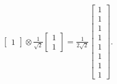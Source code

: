 \documentclass[en]{sol-man}
\begin{document}
\begin{sol}
\begin{align}
\begin{bmatrix}
            1
        \end{bmatrix}\otimes\frac{1}{\sqrt{2}}\begin{bmatrix}
            1\\
            1
        \end{bmatrix}=\frac{1}{2\sqrt{2}}\begin{bmatrix}
            1\\
            1\\
            1\\
            1\\
            1\\
            1\\
            1\\
            1
        \end{bmatrix}.
    \end{align}
\end{sol}
\end{document}
